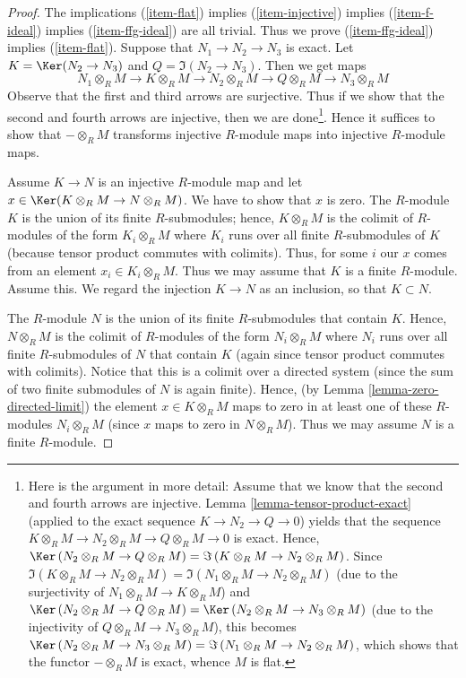 \begin{proof}
The implications (\ref{item-flat}) implies (\ref{item-injective})
implies (\ref{item-f-ideal}) implies (\ref{item-ffg-ideal}) are all
trivial. Thus we prove (\ref{item-ffg-ideal}) implies (\ref{item-flat}).
Suppose that $N_1 \to N_2 \to N_3$ is exact.
Let $K = \Ker(N_2 \to N_3)$ and $Q = \Im(N_2 \to N_3)$.
Then we get maps
$$
N_1 \otimes_R M \to
K \otimes_R M \to
N_2 \otimes_R M \to
Q \otimes_R M \to
N_3 \otimes_R M
$$
Observe that the first and third arrows are surjective. Thus if we show
that the second and fourth arrows are injective, then we are
done\footnote{Here is the argument in more detail:
Assume that we know that the second and fourth arrows are
injective. Lemma \ref{lemma-tensor-product-exact} (applied
to the exact sequence $K \to N_2 \to Q \to 0$) yields that
the sequence $K \otimes_R M \to N_2 \otimes_R M \to
Q \otimes_R M \to 0$ is exact. Hence,
$\Ker \left(N_2 \otimes_R M \to Q \otimes_R M\right)
= \Im \left(K \otimes_R M \to N_2 \otimes_R M\right)$.
Since
$\Im \left(K \otimes_R M \to N_2 \otimes_R M\right)
= \Im \left(N_1 \otimes_R M \to N_2 \otimes_R M\right)$
(due to the surjectivity of $N_1 \otimes_R M \to
K \otimes_R M$) and
$\Ker \left(N_2 \otimes_R M \to Q \otimes_R M\right)
= \Ker \left(N_2 \otimes_R M \to N_3 \otimes_R M\right)$
(due to the injectivity of $Q \otimes_R M \to
N_3 \otimes_R M$), this becomes
$\Ker \left(N_2 \otimes_R M \to N_3 \otimes_R M\right)
= \Im \left(N_1 \otimes_R M \to N_2 \otimes_R M\right)$,
which shows that the functor $- \otimes_R M$ is exact,
whence $M$ is flat.}.
Hence it suffices to show that $- \otimes_R M$ transforms
injective $R$-module maps into injective $R$-module maps.

\medskip\noindent
Assume $K \to N$ is an injective $R$-module map and
let $x \in \Ker(K \otimes_R M \to N \otimes_R M)$.
We have to show that $x$ is zero.
The $R$-module $K$ is the union of its finite
$R$-submodules; hence, $K \otimes_R M$ is
the colimit of $R$-modules of the form
$K_i \otimes_R M$ where $K_i$ runs over all finite
$R$-submodules of $K$
(because tensor product commutes with colimits).
Thus, for some $i$ our $x$ comes from an element
$x_i \in K_i \otimes_R M$. Thus we may assume that $K$
is a finite $R$-module. Assume this. We regard the
injection $K \to N$ as an inclusion, so that
$K \subset N$.

\medskip\noindent
The $R$-module $N$ is the union of its finite
$R$-submodules that contain $K$. Hence, $N \otimes_R M$
is the colimit of $R$-modules of the form
$N_i \otimes_R M$ where $N_i$ runs over all finite
$R$-submodules of $N$ that contain $K$
(again since tensor product commutes with colimits).
Notice that this is a colimit over a directed system
(since the sum of two finite submodules of $N$ is
again finite).
Hence, (by Lemma \ref{lemma-zero-directed-limit})
the element $x \in K \otimes_R M$ maps to
zero in at least one of these $R$-modules
$N_i \otimes_R M$ (since $x$ maps to zero
in $N \otimes_R M$).
Thus we may assume $N$ is a finite $R$-module.


\end{proof}
